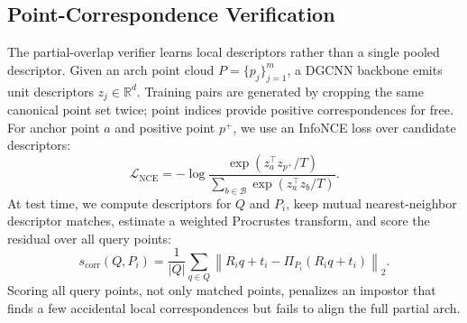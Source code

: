 \documentclass[10pt,twocolumn]{article}
\newcommand{\R}{\mathbb{R}}
\newcommand{\score}{s}
\begin{document}
\subsection{Point-Correspondence Verification}
The partial-overlap verifier learns local descriptors rather than a single pooled descriptor. Given an arch point cloud $P=\{p_j\}_{j=1}^m$, a DGCNN backbone emits unit descriptors $z_j\in\R^d$. Training pairs are generated by cropping the same canonical point set twice; point indices provide positive correspondences for free. For anchor point $a$ and positive point $p^+$, we use an InfoNCE loss over candidate descriptors:
\begin{equation}
  \mathcal{L}_{\mathrm{NCE}}
  = -\log \frac{\exp(z_a^\top z_{p^+}/T)}
  {\sum_{b\in \mathcal{B}}\exp(z_a^\top z_b/T)}.
\end{equation}
At test time, we compute descriptors for $Q$ and $P_i$, keep mutual nearest-neighbor descriptor matches, estimate a weighted Procrustes transform, and score the residual over all query points:
\begin{equation}
  \score_{\text{corr}}(Q,P_i)
  = \frac{1}{|Q|}\sum_{q\in Q}
     \left\| R_i q + t_i - \Pi_{P_i}(R_i q+t_i) \right\|_2 .
\end{equation}
Scoring all query points, not only matched points, penalizes an impostor that finds a few accidental local correspondences but fails to align the full partial arch.
\end{document}

